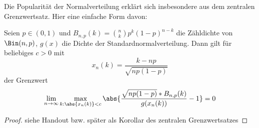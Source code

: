 Die Popularität der Normalverteilung erklärt sich insbesondere aus dem zentralen Grenzwertsatz. Hier eine einfache Form davon:

\begin{proposition}
	\label{7_2_definition}
	Seien $p \in (0,1)$ und $B_{n,p}(k) = \binom{n}{k}p^k(1-p)^{n-k}$ die Zähldichte von $\Bin(n,p)$, $g(x)$ die Dichte der Standardnormalverteilung. Dann gilt für beliebiges $c>0$ mit
	\begin{equation*}
		x_n(k) = \frac{k-np}{\sqrt{np(1-p)}}
	\end{equation*}
	der Grenzwert
	\begin{equation*}
		\lim_{n\to \infty} \max_{k : \abs{x_n(k)} < c} \abs{\frac{\sqrt{np(1-p)} * B_{n,p}(k)}{g(x_n(k))} -1} = 0
	\end{equation*}
\end{proposition}
\begin{proof}
	siehe Handout bzw. später als Korollar des zentralen Grenzwertsatzes
\end{proof}